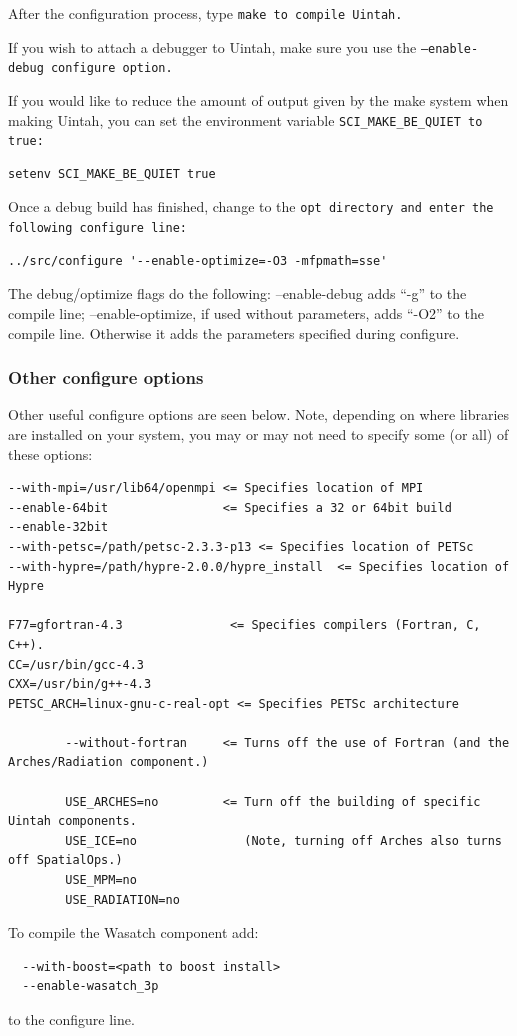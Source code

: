 \documentclass[12pt]{article}
\newcommand{\TT}[1]{\tt{#1} \normalfont}
\begin{document}
After the configuration process, type \TT{make} to compile Uintah.

If you wish to attach a debugger to Uintah, make sure you use the \TT{--enable-debug} configure option.

If you would like to reduce the amount of output given by the make system when making Uintah, 
you can set the environment variable \TT{SCI\_MAKE\_BE\_QUIET} to true:

\begin{verbatim}
setenv SCI_MAKE_BE_QUIET true
\end{verbatim}

Once a debug build has finished, change to the \TT{opt} directory and
enter the following configure line:

\begin{verbatim}
../src/configure '--enable-optimize=-O3 -mfpmath=sse' 
\end{verbatim}

The debug/optimize flags do the following:  --enable-debug adds ``-g''
to the compile line; --enable-optimize, if used without parameters,
adds ``-O2'' to the compile line.  Otherwise it adds the parameters
specified during configure.

\subsubsection{Other configure options}

Other useful configure options are seen below.  Note, depending on
where libraries are installed on your system, you may or may not need
to specify some (or all) of these options:

\begin{verbatim}
--with-mpi=/usr/lib64/openmpi <= Specifies location of MPI
--enable-64bit                <= Specifies a 32 or 64bit build
--enable-32bit
--with-petsc=/path/petsc-2.3.3-p13 <= Specifies location of PETSc
--with-hypre=/path/hypre-2.0.0/hypre_install  <= Specifies location of Hypre

F77=gfortran-4.3               <= Specifies compilers (Fortran, C, C++).
CC=/usr/bin/gcc-4.3
CXX=/usr/bin/g++-4.3
PETSC_ARCH=linux-gnu-c-real-opt <= Specifies PETSc architecture

        --without-fortran     <= Turns off the use of Fortran (and the Arches/Radiation component.)

        USE_ARCHES=no         <= Turn off the building of specific Uintah components.
        USE_ICE=no               (Note, turning off Arches also turns off SpatialOps.)
        USE_MPM=no
        USE_RADIATION=no

\end{verbatim}
To compile the Wasatch component add:
\begin{verbatim}
  --with-boost=<path to boost install>
  --enable-wasatch_3p
\end{verbatim}
to the configure line.
\end{document}
